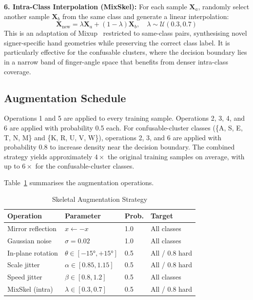 \documentclass[conference]{IEEEtran}
\begin{document}
\textbf{6. Intra-Class Interpolation (MixSkel):} For each sample $\mathbf{X}_a$,
randomly select another sample $\mathbf{X}_b$ from the same class and generate
a linear interpolation:
\begin{equation}
  \mathbf{X}_\text{new} = \lambda \mathbf{X}_a + (1-\lambda)\mathbf{X}_b,
  \quad \lambda \sim \mathcal{U}(0.3, 0.7)
\end{equation}
This is an adaptation of Mixup~\cite{zhang2018mixup} restricted to same-class
pairs, synthesising novel signer-specific hand geometries while preserving the
correct class label. It is particularly effective for the confusable clusters,
where the decision boundary lies in a narrow band of finger-angle space that
benefits from denser intra-class coverage.

\subsection{Augmentation Schedule}

Operations 1 and 5 are applied to every training sample. Operations 2, 3, 4,
and 6 are applied with probability 0.5 each. For confusable-cluster classes
(\{A, S, E, T, N, M\} and \{K, R, U, V, W\}), operations 2, 3, and 6 are
applied with probability 0.8 to increase density near the decision boundary.
The combined strategy yields approximately $4\times$ the original training
samples on average, with up to $6\times$ for the confusable-cluster classes.

Table~\ref{tab:augment} summarises the augmentation operations.

\begin{table}[htbp]
\caption{Skeletal Augmentation Strategy}
\label{tab:augment}
\centering
\renewcommand{\arraystretch}{1.15}
\begin{tabular}{p{2.2cm} p{2.2cm} p{0.6cm} p{1.6cm}}
\toprule
\textbf{Operation} & \textbf{Parameter} & \textbf{Prob.} & \textbf{Target} \\
\midrule
Mirror reflection   & $x \leftarrow -x$                & 1.0  & All classes \\
Gaussian noise      & $\sigma = 0.02$                  & 1.0  & All classes \\
In-plane rotation   & $\theta \in [-15°, +15°]$        & 0.5  & All / 0.8 hard \\
Scale jitter        & $\alpha \in [0.85, 1.15]$        & 0.5  & All / 0.8 hard \\
Speed jitter        & $\beta \in [0.8, 1.2]$           & 0.5  & All classes \\
MixSkel (intra)     & $\lambda \in [0.3, 0.7]$         & 0.5  & All / 0.8 hard \\
\bottomrule
\end{tabular}
\end{table}
\end{document}
